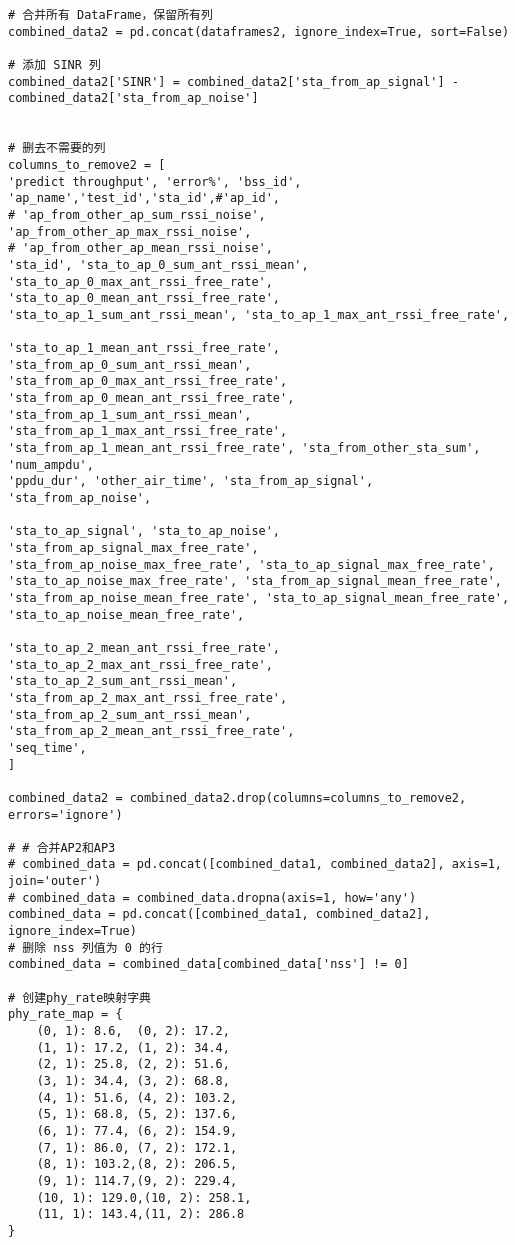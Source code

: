 \documentclass[bwprint,fontset=windows]{gmcmthesis}
\begin{document}
\begin{lstlisting}
# 合并所有 DataFrame，保留所有列
combined_data2 = pd.concat(dataframes2, ignore_index=True, sort=False)

# 添加 SINR 列
combined_data2['SINR'] = combined_data2['sta_from_ap_signal'] - combined_data2['sta_from_ap_noise']


# 删去不需要的列
columns_to_remove2 = [
'predict throughput', 'error%', 'bss_id', 'ap_name','test_id','sta_id',#'ap_id',
# 'ap_from_other_ap_sum_rssi_noise', 'ap_from_other_ap_max_rssi_noise',
# 'ap_from_other_ap_mean_rssi_noise', 
'sta_id', 'sta_to_ap_0_sum_ant_rssi_mean',
'sta_to_ap_0_max_ant_rssi_free_rate', 'sta_to_ap_0_mean_ant_rssi_free_rate',
'sta_to_ap_1_sum_ant_rssi_mean', 'sta_to_ap_1_max_ant_rssi_free_rate',

'sta_to_ap_1_mean_ant_rssi_free_rate', 'sta_from_ap_0_sum_ant_rssi_mean',
'sta_from_ap_0_max_ant_rssi_free_rate', 'sta_from_ap_0_mean_ant_rssi_free_rate',
'sta_from_ap_1_sum_ant_rssi_mean', 'sta_from_ap_1_max_ant_rssi_free_rate',
'sta_from_ap_1_mean_ant_rssi_free_rate', 'sta_from_other_sta_sum', 'num_ampdu',
'ppdu_dur', 'other_air_time', 'sta_from_ap_signal', 'sta_from_ap_noise',

'sta_to_ap_signal', 'sta_to_ap_noise', 'sta_from_ap_signal_max_free_rate',
'sta_from_ap_noise_max_free_rate', 'sta_to_ap_signal_max_free_rate',
'sta_to_ap_noise_max_free_rate', 'sta_from_ap_signal_mean_free_rate',
'sta_from_ap_noise_mean_free_rate', 'sta_to_ap_signal_mean_free_rate',
'sta_to_ap_noise_mean_free_rate',

'sta_to_ap_2_mean_ant_rssi_free_rate', 'sta_to_ap_2_max_ant_rssi_free_rate',
'sta_to_ap_2_sum_ant_rssi_mean',           
'sta_from_ap_2_max_ant_rssi_free_rate',    
'sta_from_ap_2_sum_ant_rssi_mean',         
'sta_from_ap_2_mean_ant_rssi_free_rate',
'seq_time',
]

combined_data2 = combined_data2.drop(columns=columns_to_remove2, errors='ignore')

# # 合并AP2和AP3
# combined_data = pd.concat([combined_data1, combined_data2], axis=1, join='outer')
# combined_data = combined_data.dropna(axis=1, how='any')
combined_data = pd.concat([combined_data1, combined_data2], ignore_index=True)
# 删除 nss 列值为 0 的行
combined_data = combined_data[combined_data['nss'] != 0]

# 创建phy_rate映射字典
phy_rate_map = {
	(0, 1): 8.6,  (0, 2): 17.2,
	(1, 1): 17.2, (1, 2): 34.4,
	(2, 1): 25.8, (2, 2): 51.6,
	(3, 1): 34.4, (3, 2): 68.8,
	(4, 1): 51.6, (4, 2): 103.2,
	(5, 1): 68.8, (5, 2): 137.6,
	(6, 1): 77.4, (6, 2): 154.9,
	(7, 1): 86.0, (7, 2): 172.1,
	(8, 1): 103.2,(8, 2): 206.5,
	(9, 1): 114.7,(9, 2): 229.4,
	(10, 1): 129.0,(10, 2): 258.1,
	(11, 1): 143.4,(11, 2): 286.8
}


\end{lstlisting}
\end{document}
